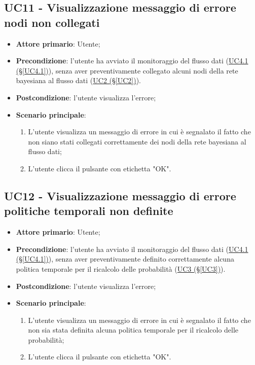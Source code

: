 \pagebreak

\subsection{UC11 - Visualizzazione messaggio di errore nodi non collegati}\label{UC11}
\begin{itemize}
\item \textbf{Attore primario}: Utente;
\item \textbf{Precondizione}: l'utente ha avviato il monitoraggio del flusso dati (\hyperref[UC4.1]{UC4.1 							(§\ref*{UC4.1})}), senza aver preventivamente collegato alcuni nodi della rete bayesiana al flusso dati 							(\hyperref[UC2]{UC2 (§\ref*{UC2})}).
\item \textbf{Postcondizione}: l'utente visualizza l'errore;
\item \textbf{Scenario principale}: 
	\begin{enumerate}
	\item L'utente visualizza un messaggio di errore in cui è segnalato il fatto che non siano stati collegati 						correttamente dei nodi della rete bayesiana al flusso dati;
	\item L'utente clicca il pulsante con etichetta "OK".
	\end{enumerate}
\end{itemize}

\pagebreak

\subsection{UC12 - Visualizzazione messaggio di errore politiche temporali non definite}\label{UC12}
\begin{itemize}
\item \textbf{Attore primario}: Utente;
\item \textbf{Precondizione}: l'utente ha avviato il monitoraggio del flusso dati (\hyperref[UC4.1]{UC4.1 							(§\ref*{UC4.1})}), senza aver preventivamente definito correttamente alcuna politica temporale per il ricalcolo delle probabilità (\hyperref[UC3]{UC3 (§\ref*{UC3})}).
\item \textbf{Postcondizione}: l'utente visualizza l'errore;
\item \textbf{Scenario principale}: 
	\begin{enumerate}
	\item L'utente visualizza un messaggio di errore in cui è segnalato il fatto che non sia stata definita alcuna 				politica temporale per il ricalcolo delle probabilità;
	\item L'utente clicca il pulsante con etichetta "OK".
	\end{enumerate}
\end{itemize}

